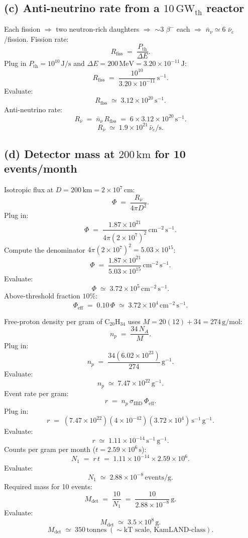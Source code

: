 \documentclass[11pt]{article}
\begin{document}
\subsection*{(c) Anti-neutrino rate from a $10\,\text{GW}_\text{th}$ reactor}

Each fission $\Rightarrow$ two neutron-rich daughters $\Rightarrow$ ${\sim}3$ $\beta^{-}$ each $\Rightarrow$ $\bar n_{\nu}\simeq 6$ $\bar\nu_{e}$/fission. Fission rate:
\[
R_\text{fiss}\;=\;\frac{P_\text{th}}{\Delta E}.
\]
Plug in $P_\text{th}=10^{10}\,\text{J/s}$ and $\Delta E=200\,\text{MeV}=3.20\times 10^{-11}\,\text{J}$:
\[
R_\text{fiss}\;=\;\frac{10^{10}}{3.20\times 10^{-11}}\,\text{s}^{-1}.
\]
Evaluate:
\[
R_\text{fiss}\;\simeq\;3.12\times 10^{20}\,\text{s}^{-1}.
\]
Anti-neutrino rate:
\[
R_{\bar\nu}\;=\;\bar n_{\nu}\,R_\text{fiss}\;=\;6\times 3.12\times 10^{20}\,\text{s}^{-1}.
\]
\begin{equation}
\boxed{\;R_{\bar\nu}\;\simeq\;1.9\times 10^{21}\,\bar\nu_{e}/\text{s}.\;}
\end{equation}

\subsection*{(d) Detector mass at $200\,\text{km}$ for 10 events/month}

Isotropic flux at $D=200\,\text{km}=2\times 10^{7}\,\text{cm}$:
\[
\Phi\;=\;\frac{R_{\bar\nu}}{4\pi D^{2}}.
\]
Plug in:
\[
\Phi\;=\;\frac{1.87\times 10^{21}}{4\pi(2\times 10^{7})^{2}}\,\text{cm}^{-2}\,\text{s}^{-1}.
\]
Compute the denominator $4\pi(2\times 10^{7})^{2}=5.03\times 10^{15}$:
\[
\Phi\;=\;\frac{1.87\times 10^{21}}{5.03\times 10^{15}}\,\text{cm}^{-2}\,\text{s}^{-1}.
\]
Evaluate:
\[
\Phi\;\simeq\;3.72\times 10^{5}\,\text{cm}^{-2}\,\text{s}^{-1}.
\]
Above-threshold fraction $10\%$:
\[
\Phi_\text{eff}\;=\;0.10\,\Phi\;\simeq\;3.72\times 10^{4}\,\text{cm}^{-2}\,\text{s}^{-1}.
\]

Free-proton density per gram of $\text{C}_{20}\text{H}_{34}$ uses $M=20(12)+34=274\,\text{g/mol}$:
\[
n_{p}\;=\;\frac{34\,N_{A}}{M}.
\]
Plug in:
\[
n_{p}\;=\;\frac{34(6.02\times 10^{23})}{274}\,\text{g}^{-1}.
\]
Evaluate:
\[
n_{p}\;\simeq\;7.47\times 10^{22}\,\text{g}^{-1}.
\]
Event rate per gram:
\[
r\;=\;n_{p}\,\sigma_\text{IBD}\,\Phi_\text{eff}.
\]
Plug in:
\[
r\;=\;(7.47\times 10^{22})(4\times 10^{-42})(3.72\times 10^{4})\,\text{s}^{-1}\,\text{g}^{-1}.
\]
Evaluate:
\[
r\;\simeq\;1.11\times 10^{-14}\,\text{s}^{-1}\,\text{g}^{-1}.
\]
Counts per gram per month ($t=2.59\times 10^{6}\,\text{s}$):
\[
N_{1}\;=\;r\,t\;=\;1.11\times 10^{-14}\times 2.59\times 10^{6}.
\]
Evaluate:
\[
N_{1}\;\simeq\;2.88\times 10^{-8}\,\text{events/g}.
\]
Required mass for 10 events:
\[
M_\text{det}\;=\;\frac{10}{N_{1}}\;=\;\frac{10}{2.88\times 10^{-8}}\,\text{g}.
\]
Evaluate:
\[
M_\text{det}\;\simeq\;3.5\times 10^{8}\,\text{g}.
\]
\begin{equation}
\boxed{\;M_\text{det}\;\simeq\;350\,\text{tonnes}\;(\sim\!\text{kT scale, KamLAND-class}).\;}
\end{equation}
\end{document}

